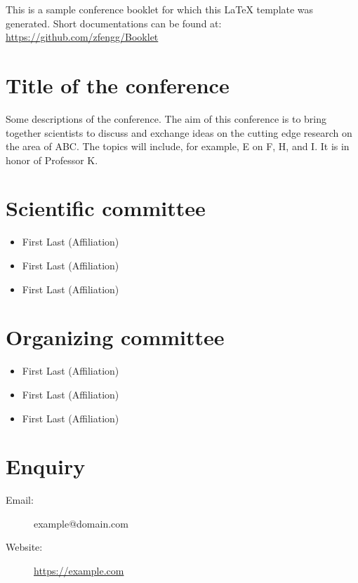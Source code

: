 \documentclass[openany,parskip=half,12pt,a4paper,table]{scrbook}
\begin{document}
{\small \textcolor{myblue}{This is a sample conference booklet for which this \LaTeX{} template was generated. Short documentations can be found at:\\ \url{https://github.com/zfengg/Booklet}}

\section{Title of the conference}

Some descriptions of the conference. The aim of this conference is to bring together scientists to discuss and exchange ideas on the cutting edge research on the area of ABC. The topics will include, for example, E on F, H, and I. It is in honor of Professor K.

\section{Scientific committee}
\begin{itemize}
	\item First Last (Affiliation)
	
	\item First Last (Affiliation)
	
	\item First Last (Affiliation)
\end{itemize}

\section{Organizing committee}
\begin{itemize}
	\item First Last (Affiliation)
	
	\item First Last (Affiliation)
	
	\item First Last (Affiliation)
\end{itemize}

\section{Enquiry}

\begin{description}
	\item[Email:] example@domain.com
	
	\item[Website:] \url{https://example.com}
	

\end{description}}
\end{document}
